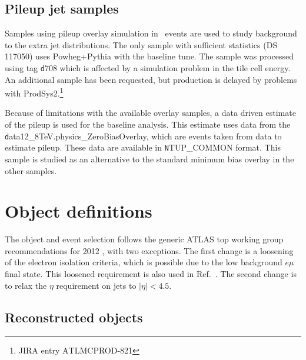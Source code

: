 \subsection{Pileup jet samples}
Samples using pileup overlay simulation in \ttbar\ events are used to study background to the extra jet distributions. The only sample with sufficient statistics (DS 117050) uses {\textsc  Powheg+Pythia} with the baseline tune. The sample was processed using tag {\texttt d708} which is affected by a simulation problem in the tile cell energy. An additional sample has been requested, but production is delayed by problems with ProdSys2.\footnote{JIRA entry {\textsc  ATLMCPROD-821}} 

Because of limitations with the available overlay samples, a data driven estimate of the pileup is used for the baseline
analysis.  This estimate uses 
data from the {\texttt data12\_8TeV.physics\_ZeroBiasOverlay}, which are events taken from data to estimate pileup. These data are available in {\texttt NTUP\_COMMON} format. This sample is studied as an alternative to the standard minimum bias overlay in the other samples.
\section{Object definitions}
The object and event selection follows the generic ATLAS top working
group recommendations for 2012 \cite{topreco}, with two exceptions. The first change is a loosening of the electron isolation criteria, which is possible due to the low background  $e\mu$ final state. This loosened requirement is also used in Ref.~\cite{xsec}. The second change is to relax the $\eta$ requirement on  jets to $|\eta|<4.5$.

\subsection{Reconstructed objects}\label{s:objects}


